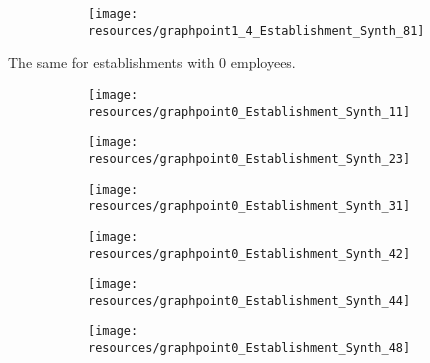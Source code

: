 \documentclass[12pt]{article}
\begin{document}
\begin{figure}[H]
	\centering
	\begin{subfigure}[b]{0.4\textwidth}
	    \texttt{[image: resources/graphpoint1\_4\_Establishment\_Synth\_81]}
	\end{subfigure}
\end{figure}


\pagebreak
The same for establishments with 0 employees. 
\begin{center}
	\centering
	
\end{center}

\begin{center}
	\centering
	
\end{center}

\begin{center}
	\centering
	
\end{center}


\begin{figure}[H]
	\centering
	\begin{subfigure}[b]{0.4\textwidth}
	    \texttt{[image: resources/graphpoint0\_Establishment\_Synth\_11]}
	\end{subfigure}
	\begin{subfigure}[b]{0.4\textwidth}
		  \texttt{[image: resources/graphpoint0\_Establishment\_Synth\_23]}
	\end{subfigure}
\end{figure}

\begin{figure}[H]
	\centering
	\begin{subfigure}[b]{0.4\textwidth}
	    \texttt{[image: resources/graphpoint0\_Establishment\_Synth\_31]}
	\end{subfigure}
	\begin{subfigure}[b]{0.4\textwidth}
		  \texttt{[image: resources/graphpoint0\_Establishment\_Synth\_42]}
	\end{subfigure}
\end{figure}

\begin{figure}[H]
	\centering
	\begin{subfigure}[b]{0.4\textwidth}
	    \texttt{[image: resources/graphpoint0\_Establishment\_Synth\_44]}
	\end{subfigure}
	\begin{subfigure}[b]{0.4\textwidth}
		  \texttt{[image: resources/graphpoint0\_Establishment\_Synth\_48]}
	\end{subfigure}
\end{figure}
\end{document}
